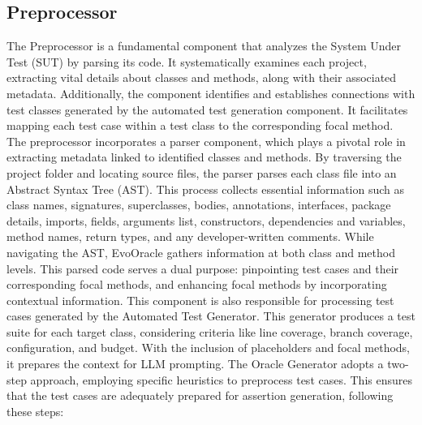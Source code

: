 \vspace{0.1 cm}
\subsection{Preprocessor}
\label{subsec:preprocessor}
\vspace{0.1 cm}

    The Preprocessor is a fundamental component that analyzes the System Under Test (SUT) by parsing its code. It systematically examines each project, extracting vital details about classes and methods, along with their associated metadata. Additionally, the component identifies and establishes connections with test classes generated by the automated test generation component. It facilitates mapping each test case within a test class to the corresponding focal method. The preprocessor incorporates a parser component, which plays a pivotal role in extracting metadata linked to identified classes and methods. By traversing the project folder and locating source files, the parser parses each class file into an Abstract Syntax Tree (AST). This process collects essential information such as class names, signatures, superclasses, bodies, annotations, interfaces, package details, imports, fields, arguments list, constructors, dependencies and variables, method names, return types, and any developer-written comments. While navigating the AST, EvoOracle gathers information at both class and method levels. This parsed code serves a dual purpose: pinpointing test cases and their corresponding focal methods, and enhancing focal methods by incorporating contextual information. This component is also responsible for processing test cases generated by the Automated Test Generator. This generator produces a test suite for each target class, considering criteria like line coverage, branch coverage, configuration, and budget. With the inclusion of placeholders and focal methods, it prepares the context for LLM prompting. The Oracle Generator adopts a two-step approach, employing specific heuristics to preprocess test cases. This ensures that the test cases are adequately prepared for assertion generation, following these steps:
